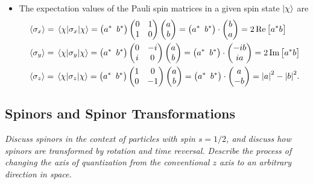 \documentclass[11pt, a4paper]{article}
\begin{document}
\begin{itemize}
	\item The expectation values of the Pauli spin matrices in a given spin state $ \ket{\chi} $ are
	\begin{align*}
		& \ev{\sigma_{x}} = \mel{\chi}{\sigma_{x}}{\chi} = \big(a^{*} \, \ b^{*}\big) 
		\begin{pmatrix}
			0 & 1\\
			1 & 0
		\end{pmatrix}
		\begin{pmatrix}
			a\\
			b
		\end{pmatrix}
			= \big(a^{*} \, \ b^{*}\big)\cdot 
		\begin{pmatrix}
			b\\
			a
		\end{pmatrix}
		= 2 \Re \big[a^{*}b\big]\\
		& \ev{\sigma_{y}} = \mel{\chi}{\sigma_{y}}{\chi} = \big(a^{*} \, \ b^{*}\big) 
		\begin{pmatrix}
			0 & -i\\
			i & 0
		\end{pmatrix}
		\begin{pmatrix}
			a\\
			b
		\end{pmatrix}
			= \big(a^{*} \, \ b^{*}\big)\cdot 
		\begin{pmatrix}
			-ib\\
			ia
		\end{pmatrix}
		= 2 \Im \big[a^{*}b\big]\\
		& \ev{\sigma_{z}} = \mel{\chi}{\sigma_{z}}{\chi} = \big(a^{*} \, \ b^{*}\big) 
		\begin{pmatrix}
			1 & 0\\
			0 & -1
		\end{pmatrix}
		\begin{pmatrix}
			a\\
			b
		\end{pmatrix}
			= \big(a^{*} \, \ b^{*}\big)\cdot 
		\begin{pmatrix}
			a\\
			-b
		\end{pmatrix}
		= \abs{a}^{2} - \abs{b}^{2}.
	\end{align*}

\end{itemize}

\subsection{Spinors and Spinor Transformations}
\textit{Discuss spinors in the context of particles with spin $ s = 1/2 $, and discuss how spinors are transformed by rotation and time reversal. Describe the process of changing the axis of quantization from the conventional $ z $ axis to an arbitrary direction in space.}
\end{document}
